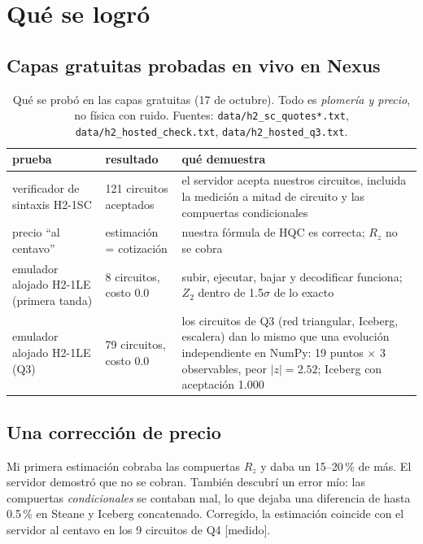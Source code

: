 \documentclass[11pt,a4paper]{article}
\newcommand{\code}[1]{\nolinkurl{#1}}
\begin{document}
\section{Qu\'e se logr\'o}

\subsection{Capas gratuitas probadas en vivo en Nexus}
\begin{table}[!ht]\centering\small
\caption{Qu\'e se prob\'o en las capas gratuitas (17 de octubre). Todo es \emph{plomer\'ia y precio}, no
f\'isica con ruido. Fuentes: \code{data/h2\_sc\_quotes*.txt}, \code{data/h2\_hosted\_check.txt},
\code{data/h2\_hosted\_q3.txt}.}
\begin{tabular}{p{4.3cm}p{3.1cm}p{6.6cm}}
\toprule
prueba & resultado & qu\'e demuestra\\
\midrule
verificador de sintaxis H2-1SC & 121 circuitos aceptados & el servidor acepta nuestros circuitos, incluida la medici\'on a mitad de circuito y las compuertas condicionales\\
precio ``al centavo'' & estimaci\'on = cotizaci\'on & nuestra f\'ormula de HQC es correcta; $R_z$ no se cobra\\
emulador alojado H2-1LE (primera tanda) & 8 circuitos, costo 0.0 & subir, ejecutar, bajar y decodificar funciona; $Z_2$ dentro de 1.5$\sigma$ de lo exacto\\
emulador alojado H2-1LE (Q3) & 79 circuitos, costo 0.0 & los circuitos de Q3 (red triangular, Iceberg, escalera) dan lo mismo que una evoluci\'on independiente en NumPy: 19 puntos $\times$ 3 observables, peor $|z|=2.52$; Iceberg con aceptaci\'on 1.000\\
\bottomrule
\end{tabular}
\end{table}

\subsection{Una correcci\'on de precio}
Mi primera estimaci\'on cobraba las compuertas $R_z$ y daba un 15--20\,\% de m\'as. El servidor demostr\'o que no
se cobran. Tambi\'en descubr\'i un error m\'io: las compuertas \emph{condicionales} se contaban mal, lo que
dejaba una diferencia de hasta 0.5\,\% en Steane y Iceberg concatenado. Corregido, la estimaci\'on coincide
con el servidor al centavo en los 9 circuitos de Q4 [medido].
\end{document}
